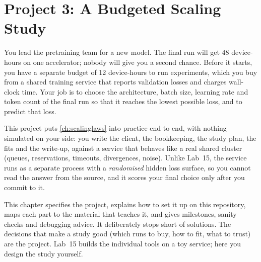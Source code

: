 \chapter{Project 3: A Budgeted Scaling Study}\label{ch:proj3}

You lead the pretraining team for a new model. The final run will get 48 device-hours on one
accelerator; nobody will give you a second chance. Before it starts, you have a separate budget of
12 device-hours to run experiments, which you buy from a shared training service that reports
validation losses and charges wall-clock time. Your job is to choose the architecture, batch size,
learning rate and token count of the final run so that it reaches the lowest possible loss, and to
predict that loss.

This project puts \cref{ch:scalinglaws} into practice end to end, with nothing simulated on your
side: you write the client, the bookkeeping, the study plan, the fits and the write-up, against
a service that behaves like a real shared cluster (queues, reservations, timeouts, divergences,
noise). Unlike Lab~15, the service runs as a separate process with a \emph{randomised} hidden loss
surface, so you cannot read the answer from the source, and it scores your final choice only
after you commit to it.

\begin{keyidea}
This chapter specifies the project, explains how to set it up on this repository, maps each part
to the material that teaches it, and gives milestones, sanity checks and debugging advice. It
deliberately stops short of solutions. The decisions that make a study good (which runs to buy,
how to fit, what to trust) are the project. Lab~15 builds the individual tools on a toy
service; here you design the study yourself.
\end{keyidea}

